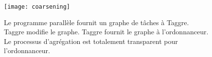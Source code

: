 \begin{figure}[t!]
  \centering
  \texttt{[image: coarsening]}
  \caption{Le programme parallèle fournit un graphe de tâches à Taggre. Taggre modifie le graphe. Taggre fournit le graphe à l'ordonnanceur. Le processus d'agrégation est totalement transparent pour l'ordonnanceur.}
  \label{fig:coarsening}
\end{figure}
